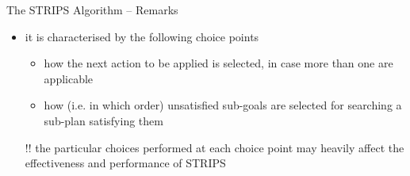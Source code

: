 \documentclass[presentation]{beamer}\mode<presentation>{\usetheme{AMSBolognaFC}}
\begin{document}
\begin{frame}[c,allowframebreaks]{The STRIPS Algorithm -- Remarks}
\begin{itemize}
\begin{description}
	\end{description}
	\item it is characterised by the following \alert{choice points}
	\begin{itemize}
		\item how the next action to be applied is selected, in case more than one are applicable
		\item how (i.e. in which order) unsatisfied sub-goals are selected for searching a sub-plan satisfying them
	\end{itemize}
	\item[!!] the particular choices performed at \alert{each} choice point may heavily affect the effectiveness and performance of STRIPS
\end{itemize}
\end{frame}
\end{document}
